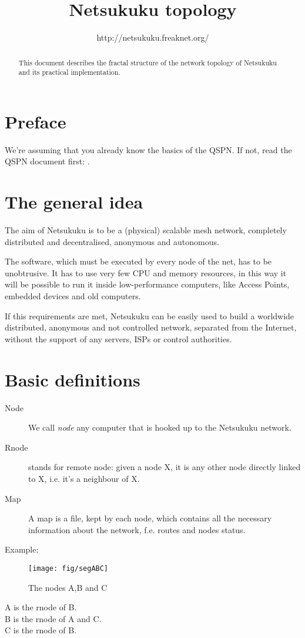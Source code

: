 \documentclass[a4paper]{article}
\title{Netsukuku topology}
\author{http://netsukuku.freaknet.org/}
\begin{document}
\maketitle

\begin{abstract}
	This document describes the fractal structure of the network topology
	of Netsukuku and its practical implementation.
\end{abstract}

\section{Preface}
\label{sec:preface}

We're assuming that you already know the basics of the QSPN. If not, read the
QSPN document first: \cite{qspndoc}.

\section{The general idea}
\label{sec:general_idea}

The aim of Netsukuku is to be a (physical) scalable mesh network, completely
distributed and decentralised, anonymous and autonomous.

The software, which must be executed by every node of the net, has to be
unobtrusive. It has to use very few CPU and memory resources, in this way it
will be possible to run it inside low-performance computers, like Access Points,
embedded devices and old computers.

If this requirements are met, Netsukuku can be easily used to build a worldwide
distributed, anonymous and not controlled network, separated from the
Internet, without the support of any servers, ISPs or control authorities.

\section{Basic definitions}

\begin{description}
	\item[Node] We call \emph{node} any computer that is hooked up to the
		Netsukuku network.
	\item[Rnode] stands for remote node: given a node X, it is any other
		node directly linked to X, i.e. it's a neighbour of X.
	\item[Map] A map is a file, kept by each node, which contains all the
		necessary information about the network, f.e. routes and nodes
		status.
\end{description}
Example:\\
\begin{figure}[h]
	\begin{center}
		\texttt{[image: fig/segABC]}
	\end{center}
	\caption{The nodes A,B and C}
\end{figure}
A is the rnode of B.\\
B is the rnode of A and C.\\
C is the rnode of B.
\end{document}
